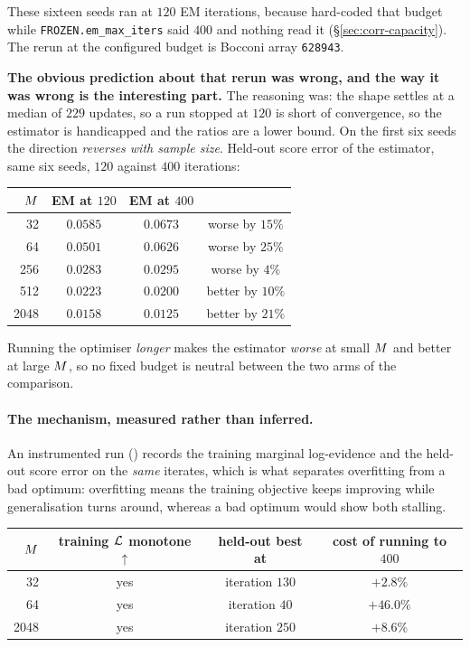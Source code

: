 \begin{pitfall}
These sixteen seeds ran at $120$ EM iterations, because  hard-coded that budget
while \texttt{FROZEN.em\_max\_iters} said $400$ and nothing read it (\S\ref{sec:corr-capacity}).
The rerun at the configured budget is Bocconi array \texttt{628943}.

\textbf{The obvious prediction about that rerun was wrong, and the way it was wrong is the
interesting part.} The reasoning was: the shape settles at a median of $229$ updates, so a run
stopped at $120$ is short of convergence, so the estimator is handicapped and the ratios are a
lower bound. On the first six seeds the direction \emph{reverses with sample size}. Held-out score
error of the estimator, same six seeds, $120$ against $400$ iterations:

\begin{center}\small
\begin{tabular}{@{}rccc@{}}
\toprule
$M$ & EM at $120$ & EM at $400$ & \\
\midrule
32   & $0.0585$ & $0.0673$ & worse by $15\%$ \\
64   & $0.0501$ & $0.0626$ & worse by $25\%$ \\
256  & $0.0283$ & $0.0295$ & worse by $4\%$ \\
512  & $0.0223$ & $0.0200$ & better by $10\%$ \\
2048 & $0.0158$ & $0.0125$ & better by $21\%$ \\
\bottomrule
\end{tabular}
\end{center}

\noindent
Running the optimiser \emph{longer} makes the estimator \emph{worse} at small $M$ and better
at large $M$, so no fixed budget is neutral between the two arms of the comparison.

\paragraph{The mechanism, measured rather than inferred.}
\label{sec:em-overfitting}
An instrumented run
() records the training marginal log-evidence and
the held-out score error on the \emph{same} iterates, which is what separates overfitting from a
bad optimum: overfitting means the training objective keeps improving while generalisation turns
around, whereas a bad optimum would show both stalling.

\begin{center}\small
\begin{tabular}{@{}rccc@{}}
\toprule
$M$ & training $\mathcal{L}$ monotone $\uparrow$ & held-out best at & cost of running to $400$ \\
\midrule
32   & yes & iteration $130$ & $+2.8\%$ \\
64   & yes & iteration $40$  & $+46.0\%$ \\
2048 & yes & iteration $250$ & $+8.6\%$ \\
\bottomrule
\end{tabular}
\end{center}


\end{pitfall}
